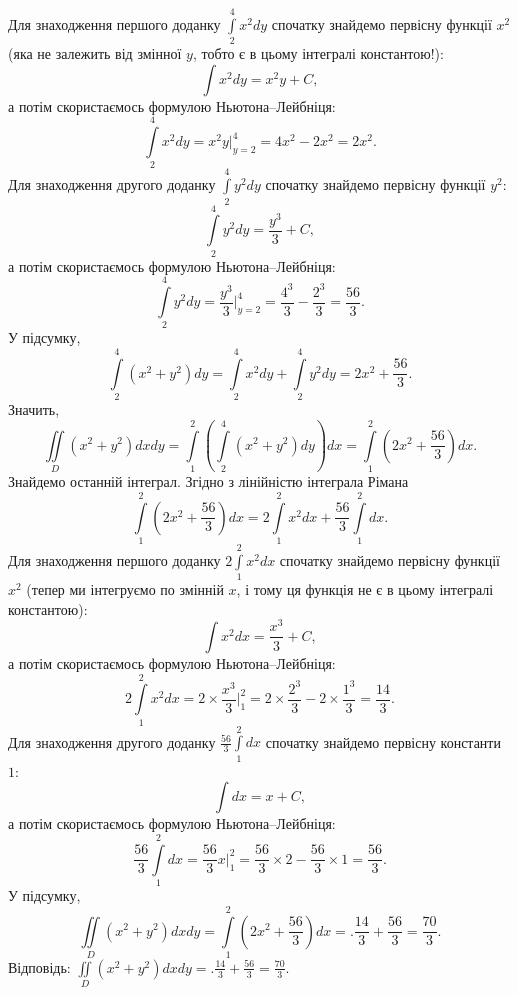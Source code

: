 \begin{solution}
Для знаходження першого доданку ${\int\limits_{2}^{4}x^{2}d y}$ спочатку знайдемо первісну функції ${x^2}$ (яка не залежить від змінної $y$, тобто є в цьому інтегралі константою!):
\[
\int x^{2}d y = x^2 y + C,
\]
а потім скористаємось формулою Ньютона--Лейбніця:
\[
\int\limits_{2}^{4}x^{2}d y = x^2 y \biggr|_{y=2}^4 = 4 x^2 - 2 x^2 = 2 x^2.
\]
Для знаходження другого доданку ${\int\limits_{2}^{4}y^{2}d y}$ спочатку знайдемо первісну функції ${y^2}$:
\[
\int\limits_{2}^{4}y^{2}d y = \frac{y^3}{3} + C,
\]
а потім скористаємось формулою Ньютона--Лейбніця:
\[
\int\limits_{2}^{4}y^{2}d y = \frac{y^3}{3} \biggr|_{y=2}^4 = \frac{4^3}{3} - \frac{2^3}{3} = \frac{56}{3}.
\]
У підсумку,
\[
\int\limits_{2}^{4}\left(x^{2}+y^{2}\right)d y = \int\limits_{2}^{4}x^{2}d y+\int\limits_{2}^{4}y^{2}d y = 2 x^2 + \frac{56}{3}.
\]
Значить,
\[
\iint\limits_{D}\left(x^2+y^2\right)d x d y = \int\limits_1^2\left(\int\limits_{2}^{4}\left(x^{2}+y^{2}\right)d y\right)dx = \int\limits_1^2\left(2 x^2 + \frac{56}{3}\right)dx.
\]
Знайдемо останній інтеграл. Згідно з лінійністю інтеграла Рімана
\[
\int\limits_1^2\left(2 x^2 + \frac{56}{3}\right)dx = 2 \int\limits_1^2 x^2 d x + \frac{56}{3}\int\limits_1^2dx.
\]
Для знаходження першого доданку ${2\int\limits_1^2 x^2 d x}$ спочатку знайдемо первісну функції ${x^2}$ (тепер ми інтегруємо по змінній $x$, і тому ця функція не  є в цьому інтегралі константою):
\[
\int x^{2}d x = \frac{x^3}{3} + C,
\]
а потім скористаємось формулою Ньютона--Лейбніця:
\[
2\int\limits_{1}^{2}x^{2}d x = 2 \times\frac{x^3}{3} \biggr|_{1}^2 = 2\times \frac{2^3}{3} - 2\times \frac{1^3}{3} = \frac{14}{3}.
\]
Для знаходження другого доданку ${\frac{56}{3}\int\limits_1^2dx}$ спочатку знайдемо первісну константи ${1}$:
\[
\int\limits d x = x + C,
\]
а потім скористаємось формулою Ньютона--Лейбніця:
\[
\frac{56}{3}\int\limits_{1}^{2} d x = \frac{56}{3} x \biggr|_{1}^2 = \frac{56}{3}\times 2 - \frac{56}{3} \times 1 = \frac{56}{3}.
\]
У підсумку,
\[
\iint\limits_{D}\left(x^2+y^2\right)d x d y =  \int\limits_1^2\left(2 x^2 + \frac{56}{3}\right)dx = .\frac{14}{3} + \frac{56}{3} = \frac{70}{3}.
\]
Відповідь: ${\iint\limits_{D}\left(x^2+y^2\right)d x d y = .\frac{14}{3} + \frac{56}{3} = \frac{70}{3}.}$
\end{solution}

